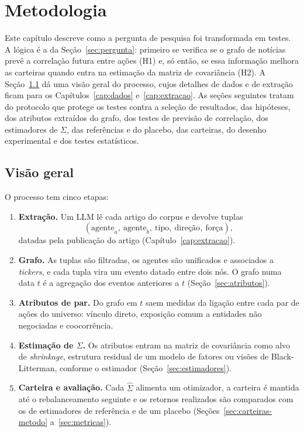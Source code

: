 \chapter{Metodologia}
\label{cap:metodologia}

Este capítulo descreve como a pergunta de pesquisa foi transformada em testes. A lógica é a da
Seção~\ref{sec:pergunta}: primeiro se verifica se o grafo de notícias prevê a correlação futura entre
ações (H1) e, só então, se essa informação melhora as carteiras quando entra na estimação da matriz de
covariância (H2). A Seção~\ref{sec:visao-geral} dá uma visão geral do processo, cujos detalhes de dados
e de extração ficam para os Capítulos~\ref{cap:dados} e~\ref{cap:extracao}. As seções seguintes tratam
do protocolo que protege os testes contra a seleção de resultados, das hipóteses, dos atributos
extraídos do grafo, dos testes de previsão de correlação, dos estimadores de $\Sigma$, das referências
e do placebo, das carteiras, do desenho experimental e dos testes estatísticos.

\section{Visão geral}
\label{sec:visao-geral}

O processo tem cinco etapas:
\begin{enumerate}
  \item \textbf{Extração.} Um LLM lê cada artigo do corpus e devolve tuplas
        \[(\text{agente}_a,\ \text{agente}_b,\ \text{tipo},\ \text{direção},\ \text{força}),\]
        datadas pela publicação do artigo (Capítulo~\ref{cap:extracao}).
  \item \textbf{Grafo.} As tuplas são filtradas, os agentes são unificados e associados a
        \emph{tickers}, e cada tupla vira um evento datado entre dois nós. O grafo numa data $t$ é a
        agregação dos eventos anteriores a $t$ (Seção~\ref{sec:atributos}).
  \item \textbf{Atributos de par.} Do grafo em $t$ saem medidas da ligação entre cada par de ações do
        universo: vínculo direto, exposição comum a entidades não negociadas e coocorrência.
  \item \textbf{Estimação de $\Sigma$.} Os atributos entram na matriz de covariância como alvo de
        \emph{shrinkage}, estrutura residual de um modelo de fatores ou visões de Black-Litterman,
        conforme o estimador (Seção~\ref{sec:estimadores}).
  \item \textbf{Carteira e avaliação.} Cada $\hat\Sigma$ alimenta um otimizador, a carteira é mantida
        até o rebalanceamento seguinte e os retornos realizados são comparados com os de estimadores de
        referência e de um placebo (Seções~\ref{sec:carteiras-metodo} a~\ref{sec:metricas}).
\end{enumerate}

